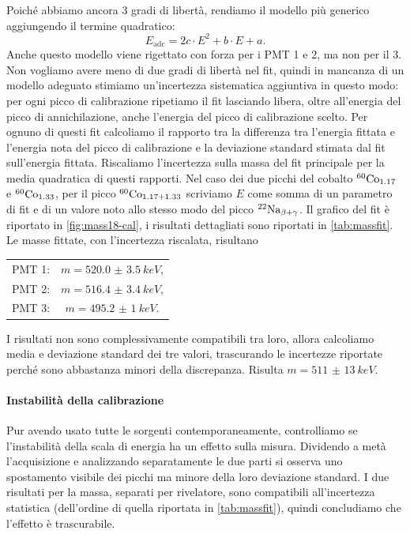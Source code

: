 Poiché abbiamo ancora 3 gradi di libertà,
rendiamo il modello più generico aggiungendo il termine quadratico:
\begin{equation}
	\label{eq:parabola}
	E_\text{adc} = 2c \cdot E^2 + b \cdot E + a.
\end{equation}
Anche questo modello viene rigettato con forza per i PMT 1 e 2, ma non per il 3.
Non vogliamo avere meno di due gradi di libertà nel fit,
quindi in mancanza di un modello adeguato stimiamo un'incertezza sistematica aggiuntiva in questo modo:
per ogni picco di calibrazione ripetiamo il fit lasciando libera,
oltre all'energia del picco di annichilazione,
anche l'energia del picco di calibrazione scelto.
Per ognuno di questi fit calcoliamo il rapporto tra
la differenza tra l'energia fittata e l'energia nota del picco di calibrazione
e la deviazione standard stimata dal fit sull'energia fittata.
Riscaliamo l'incertezza sulla massa del fit principale
per la media quadratica di questi rapporti.
Nel caso dei due picchi del cobalto $^{\text{60}}\text{Co}_{1.17}$ e $^{\text{60}}\text{Co}_{1.33}$,
per il picco $^{\text{60}}\text{Co}_{1.17+1.33}$ scriviamo $E$ come somma di un parametro di fit e di un valore noto
allo stesso modo del picco $^{\text{22}}\text{Na}_{\beta+\gamma}$.
Il grafico del fit è riportato in \autoref{fig:mass18-cal},
i risultati dettagliati sono riportati in \autoref{tab:massfit}.
Le masse fittate, con l'incertezza riscalata, risultano
\begin{center}
	\begin{tabular}{cc}
		PMT 1: & $m=\SI{520.0(35)}{keV}$, \\
		PMT 2: & $m=\SI{516.4(34)}{keV}$, \\
		PMT 3: & $m=\SI{495.2(10)}{keV}$.
	\end{tabular}
\end{center}
I risultati non sono complessivamente compatibili tra loro,
allora calcoliamo media e deviazione standard dei tre valori,
trascurando le incertezze riportate perché sono abbastanza minori della discrepanza.
Risulta $m=\SI{511(13)}{keV}$.

\paragraph{Instabilità della calibrazione}

Pur avendo usato tutte le sorgenti contemporaneamente,
controlliamo se l'instabilità della scala di energia ha un effetto sulla misura.
Dividendo a metà l'acquisizione e analizzando separatamente le due parti
si osserva uno spostamento visibile dei picchi ma minore della loro deviazione standard.
I due risultati per la massa, separati per rivelatore,
sono compatibili all'incertezza statistica
(dell'ordine di quella riportata in \autoref{tab:massfit}),
quindi concludiamo che l'effetto è trascurabile.
